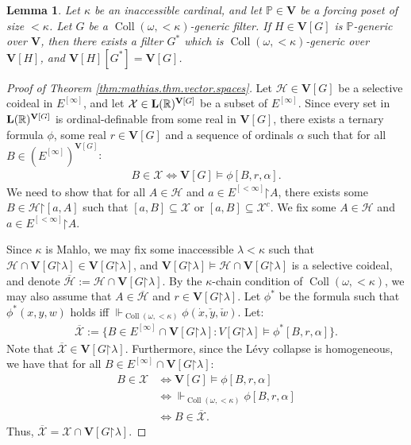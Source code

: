 \documentclass[11pt,reqno]{amsart}
\theoremstyle{plain}
\numberwithin{equation}{section}
\newtheorem{lemma}[theorem]{Lemma}
\theoremstyle{definition}
\newcommand{\func}{\operatorname}
\newcommand{\R}{\mathbb{R}}
\renewcommand{\P}{\mathbb{P}}
\renewcommand{\bar}[1]{\overline{#1}}
\newcommand{\cal}{\mathcal}
\renewcommand{\bf}{\mathbf}
\newcommand{\forces}{\Vdash}
\newcommand{\restrictedto}{\mathord{\upharpoonright}}
\newcommand{\Coll}{\func{Coll}}
\newcommand{\V}{\bf{V}}
\newcommand{\X}{\cal{X}}
\renewcommand{\H}{\cal{H}}
\let\strokeL\L
\DeclareRobustCommand{\L}{\ifmmode\mathbf{L}\else\strokeL\fi}
\begin{document}
\begin{lemma}
\label{lem:solovay.factor.lemma}
    Let $\kappa$ be an inaccessible cardinal, and let $\P \in \V$ be a forcing poset of size $<\kappa$. Let $G$ be a $\Coll(\omega,<\!\kappa)$-generic filter. If $H \in \V[G]$ is $\P$-generic over $\V$, then there exists a filter $G^*$ which is $\Coll(\omega,<\!\kappa)$-generic over $\V[H]$, and $\V[H][G^*] = \V[G]$.
\end{lemma}

\begin{proof}[Proof of Theorem \ref{thm:mathias.thm.vector.spaces}]
    Let $\H \in \V[G]$ be a selective coideal in $E^{[\infty]}$, and let $\X \in \L(\R)^{\V[G]}$ be a subset of $E^{[\infty]}$. Since every set in $\L(\R)^{\V[G]}$ is ordinal-definable from some real in $\V[G]$, there exists a ternary formula $\phi$, some real $r \in \V[G]$ and a sequence of ordinals $\alpha$ such that for all $B \in (E^{[\infty]})^{\V[G]}$:
    \begin{align*}
        B \in \X \iff \V[G] \models \phi[B,r,\alpha].
    \end{align*}
    We need to show that for all $A \in \H$ and $a \in E^{[<\infty]}\restrictedto A$, there exists some $B \in \H\restrictedto[a,A]$ such that $[a,B] \subseteq \X$ or $[a,B] \subseteq \X^c$. We fix some $A \in \H$ and $a \in E^{[<\infty]}\restrictedto A$.

    Since $\kappa$ is Mahlo, we may fix some inaccessible $\lambda < \kappa$ such that $\H \cap \V[G\restrictedto\lambda] \in \V[G\restrictedto\lambda]$, and $\V[G\restrictedto\lambda] \models \H \cap \V[G\restrictedto\lambda]$ is a selective coideal, and denote $\bar{\H} := \H \cap \V[G\restrictedto\lambda]$. By the $\kappa$-chain condition of $\Coll(\omega,<\!\kappa)$, we may also assume that $A \in \bar{\H}$ and $r \in \V[G\restrictedto\lambda]$. Let $\phi^*$ be the formula such that $\phi^*(x,y,w)$ holds iff $\forces_{\Coll(\omega,<\kappa)} \phi(\dot{x},\check{y},\check{w})$. Let:
    \begin{align*}
        \bar{\X} := \{B \in E^{[\infty]} \cap \V[G\restrictedto\lambda] : V[G\restrictedto\lambda] \models \phi^*[B,r,\alpha]\}.
    \end{align*}
    Note that $\bar{\X} \in \V[G\restrictedto\lambda]$. Furthermore, since the L\'{e}vy collapse is homogeneous, we have that for all $B \in E^{[\infty]} \cap \V[G\restrictedto\lambda]$:
    \begin{align*}
        B \in \X &\iff \V[G] \models \phi[B,r,\alpha] \\
        &\iff \forces_{\Coll(\omega,<\kappa)} \phi[B,r,\alpha] \\
        &\iff B \in \bar{\X}.
    \end{align*}
    Thus, $\bar{\X} = \X \cap \V[G\restrictedto\lambda]$. 


\end{proof}
\end{document}
